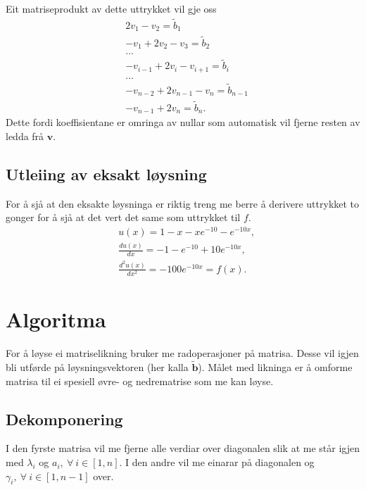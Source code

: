 \documentclass[11pt, a4paper]{article}
\begin{document}
  Eit matriseprodukt av dette uttrykket vil gje oss
  \begin{equation*}
    \begin{align}
      &2v_1 - v_2 = \tilde{b}_1 \\
      &-v_1 + 2v_2 - v_3 = \tilde{b}_2 \\
      &\dots \\
      &-v_{i-1} + 2v_i - v_{i+1} = \tilde{b}_i \\
      &\dots \\
      &-v_{n-2} + 2v_{n-1} -v_{n} = \tilde{b}_{n-1} \\
      &-v_{n-1} + 2v_{n} = \tilde{b}_n.
    \end{align}
  \end{equation*}
  Dette fordi koeffisientane er omringa av nullar som automatisk vil fjerne resten av ledda frå 
  $\mathbf{v}$.

  \subsection{Utleiing av eksakt løysning}
    For å sjå at den eksakte løysninga er riktig treng me berre å derivere uttrykket to gonger for å
    sjå at det vert det same som uttrykket til $f$.
    \begin{equation*}
      \begin{align}
        &u(x) = 1 - x - xe^{-10} - e^{-10x}, \\
        &\frac{du(x)}{dx} = -1 -e^{-10} + 10e^{-10x}, \\
        &\frac{d^2u(x)}{dx^2} = -100e^{-10x} = f(x).
      \end{align}
    \end{equation*}

\section{Algoritma}
  For å løyse ei matriselikning bruker me radoperasjoner på matrisa. Desse vil igjen bli utførde på
  løysningsvektoren (her kalla $\mathbf{\tilde{b}}$). Målet med likninga er å omforme matrisa til ei 
  spesiell øvre-  og nedrematrise som me kan løyse. 
  
  \subsection{Dekomponering}
    I den fyrste matrisa vil me fjerne alle verdiar over diagonalen slik at me står igjen med $\lambda_i$ og $a_i, \ \forall \ i \in [1, n]$. I den andre vil me einarar på diagonalen og $\gamma_i, \ \forall \ i \in [1, n - 1]$ over.
\end{document}
